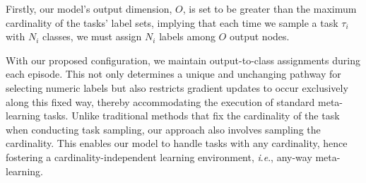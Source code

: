 \documentclass[letterpaper]{article} %
\newcommand{\jh}[1]{\textcolor{black}{#1}}
\newcommand{\yr}[1]{\textcolor{black}{#1}}
\newcommand{\ie}{\textit{i}.\textit{e}., }
\begin{document}

Firstly, our model's output dimension, $O$, is set to be greater than the maximum cardinality of the tasks' label sets, implying that each time we sample a task $\tau_i$ with $N_i$ classes, we must assign $N_i$ labels among $O$ output nodes. %

With our proposed configuration, we maintain output-to-class assignments during each episode. This not only determines a unique and unchanging pathway for selecting numeric labels but also restricts gradient updates to occur exclusively along this fixed way, thereby accommodating the execution of standard meta-learning tasks. Unlike traditional methods that fix the cardinality of the task when conducting task sampling, our approach also involves sampling the cardinality. %
This enables our model to handle tasks with any cardinality, hence fostering a cardinality-independent learning environment, \ie any-way meta-learning. 
\end{document}

